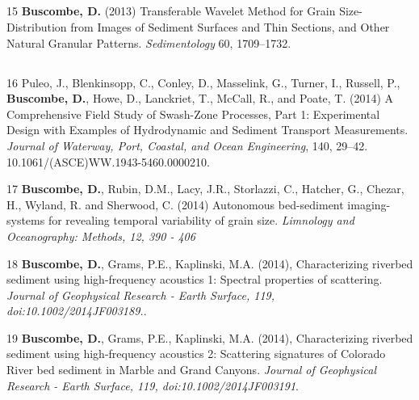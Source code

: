 \documentclass[margin,line]{resume}
\begin{document}
\begin{resume}
\begin{footnotesize}
	\subsection{}
	\begin{list1}
        \item[15] {\bf Buscombe, D.} (2013) Transferable Wavelet Method for Grain Size-Distribution from Images of Sediment Surfaces and Thin Sections, and Other Natural Granular Patterns. {\sl Sedimentology} 60, 1709--1732. 

	\end{list1}

	\subsection{}
	\begin{list1}
        \item[16] Puleo, J., Blenkinsopp, C., Conley, D., Masselink, G., Turner, I., Russell, P., {\bf Buscombe, D.}, Howe, D., Lanckriet, T., McCall, R., and Poate, T. (2014) A Comprehensive Field Study of Swash-Zone Processes, Part 1: Experimental Design with Examples of Hydrodynamic and Sediment Transport Measurements. {\sl Journal of Waterway, Port, Coastal, and Ocean Engineering}, 140, 29–42. 10.1061/(ASCE)WW.1943-5460.0000210.\\

	\item[17]  {\bf Buscombe, D.}, Rubin, D.M., Lacy, J.R., Storlazzi, C., Hatcher, G., Chezar, H., Wyland, R. and Sherwood, C. (2014) Autonomous bed-sediment imaging-systems for revealing temporal variability of grain size. {\sl Limnology and Oceanography: Methods, 12, 390 - 406}

	\item[18] {\bf Buscombe, D.}, Grams, P.E., Kaplinski, M.A. (2014), Characterizing riverbed sediment using high-frequency acoustics 1: Spectral properties of scattering. {\sl Journal of Geophysical Research - Earth Surface, 119, doi:10.1002/2014JF003189.}.\\

	\item[19] {\bf Buscombe, D.}, Grams, P.E., Kaplinski, M.A. (2014), Characterizing riverbed sediment using high-frequency acoustics 2: Scattering signatures of Colorado River bed sediment in Marble and Grand Canyons. {\sl Journal of Geophysical Research - Earth Surface, 119, doi:10.1002/2014JF003191}.\\


\end{list1}
\end{footnotesize}
\end{resume}
\end{document}
